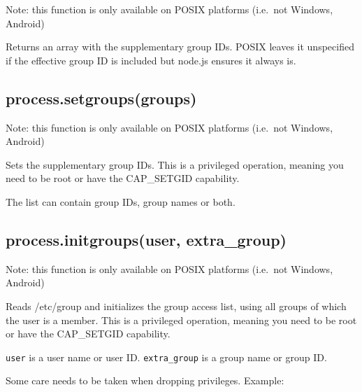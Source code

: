 Note: this function is only available on POSIX platforms (i.e.~not
Windows, Android)

Returns an array with the supplementary group IDs. POSIX leaves it
unspecified if the effective group ID is included but node.js ensures it
always is.

\subsection{process.setgroups(groups)}

Note: this function is only available on POSIX platforms (i.e.~not
Windows, Android)

Sets the supplementary group IDs. This is a privileged operation,
meaning you need to be root or have the CAP\_SETGID capability.

The list can contain group IDs, group names or both.

\subsection{process.initgroups(user, extra\_group)}

Note: this function is only available on POSIX platforms (i.e.~not
Windows, Android)

Reads /etc/group and initializes the group access list, using all groups
of which the user is a member. This is a privileged operation, meaning
you need to be root or have the CAP\_SETGID capability.

\texttt{user} is a user name or user ID. \texttt{extra\_group} is a
group name or group ID.

Some care needs to be taken when dropping privileges. Example:

\begin{Shaded}
\begin{Highlighting}[]
\NormalTok{(}\NormalTok{());         }\CommentTok{// [ 0 ]}
\NormalTok{(}\NormalTok{, }\NormalTok{);   }
\NormalTok{(}\NormalTok{());         }\CommentTok{// [ 27, 30, 46, 1000, 0 ]}
\NormalTok{(}\NormalTok{);                     }
\NormalTok{(}\NormalTok{());         }\CommentTok{// [ 27, 30, 46, 1000 ]}
\end{Highlighting}
\end{Shaded}

